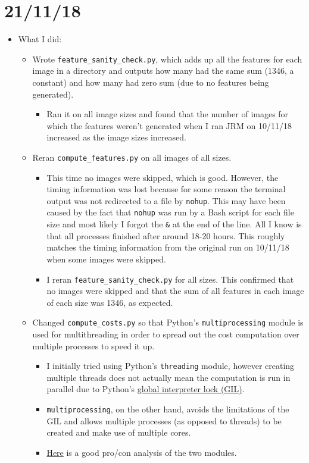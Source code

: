 \documentclass[11pt,a4paper]{report}
\begin{document}
\section{21/11/18}

\begin{itemize}

\item What I did:
  \begin{itemize}
  \item Wrote \texttt{feature\_sanity\_check.py}, which adds up all the features for each image in a directory and outputs how many had the same sum (1346, a constant) and how many had zero sum (due to no features being generated).
    \begin{itemize}
    \item Ran it on all image sizes and found that the number of images for which the features weren't generated when I ran JRM on 10/11/18 increased as the image sizes increased.
    \end{itemize}

  \item Reran \texttt{compute\_features.py} on all images of all sizes.
     \begin{itemize}
     \item This time no images were skipped, which is good. However, the timing information was lost because for some reason the terminal output was not redirected to a file by \texttt{nohup}. This may have been caused by the fact that \texttt{nohup} was run by a Bash script for each file size and most likely I forgot the \texttt{\&} at the end of the line. All I know is that all processes finished after around 18-20 hours. This roughly matches the timing information from the original run on 10/11/18 when some images were skipped.
     \item I reran \texttt{feature\_sanity\_check.py} for all sizes. This confirmed that no images were skipped and that the sum of all features in each image of each size was 1346, as expected.
     \end{itemize}

  \item Changed \texttt{compute\_costs.py} so that Python's \texttt{multiprocessing} module is used for multithreading in order to spread out the cost computation over multiple processes to speed it up.
    \begin{itemize}
    \item I initially tried using Python's \texttt{threading} module, however creating multiple threads does not actually mean the computation is run in parallel due to Python's \href{https://docs.python.org/2/glossary.html\#term-global-interpreter-lock}{global interpreter lock (GIL)}.
    \item \texttt{multiprocessing}, on the other hand, avoids the limitations of the GIL and allows multiple processes (as opposed to threads) to be created and make use of multiple cores.
    \item \href{https://stackoverflow.com/a/3046201}{Here} is a good pro/con analysis of the two modules.
    \end{itemize}


\end{itemize}
\end{itemize}
\end{document}
